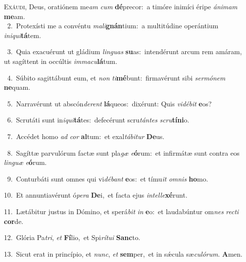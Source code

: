 \lettrine{\initial\textcolor{\initialcolor}{E}}{xáudi,} Deus, oratiónem me\textit{am} \textit{cum} \textbf{dé}\-precor:~\star a timóre inimíci éripe \textit{á}\-\textit{ni}\textit{mam} \textbf{me}\-am.\\
{\numbfont\textcolor{\numbcolor}{~2.}}~Protexísti me a convéntu \textit{ma}\-\textit{li}\textbf{gnán}tium:~\star a multitúdine operántium \textit{in}\-\textit{i}\textit{qui}\textbf{tá}tem.\par
{\numbfont\textcolor{\numbcolor}{~3.}}~Quia exacuérunt ut gládium \textit{lin}\-\textit{guas} \textbf{su}\-as:~\star intendérunt arcum rem amáram, ut sagíttent in occúltis \textit{im}\-\textit{ma}\textit{cu}\textbf{lá}tum.\par
{\numbfont\textcolor{\numbcolor}{~4.}}~Súbito sagittábunt eum, et \textit{non} \textit{ti}\-\textbf{mé}bunt:~\star firmavérunt sibi \textit{ser}\-\textit{mó}\textit{nem} \textbf{ne}\-quam.\par
{\numbfont\textcolor{\numbcolor}{~5.}}~Narravérunt ut abscón\-\textit{de}\-\textit{rent} \textbf{lá}\-queos:~\star dixérunt: Quis \textit{vi}\-\textit{dé}\textit{bit} \textbf{e}\-os?\par
{\numbfont\textcolor{\numbcolor}{~6.}}~Scrutáti sunt in\-\textit{i}\-\textit{qui}\textbf{tá}tes:~\star defecérunt scru\-\textit{tán}\-\textit{tes} \textit{scru}\-\textbf{tí}\textbf{ni}o.\par
{\numbfont\textcolor{\numbcolor}{~7.}}~Accédet homo \textit{ad} \textit{cor} \textbf{al}\-tum:~\star et exal\-\textit{tá}\-\textit{bi}\textit{tur} \textbf{De}\-us.\par
{\numbfont\textcolor{\numbcolor}{~8.}}~Sagíttæ parvulórum factæ sunt pla\textit{gæ} \textit{e}\-\textbf{ó}rum:~\star et infirmátæ sunt contra eos \textit{lin}\-\textit{guæ} \textit{e}\-\textbf{ó}rum.\par
{\numbfont\textcolor{\numbcolor}{~9.}}~Conturbáti sunt omnes qui vi\-\textit{dé}\-\textit{bant} \textbf{e}\-os:~\star et tímu\textit{it} \textit{om}\-\textit{nis} \textbf{ho}\-mo.\par
{\numbfont\textcolor{\numbcolor}{10.}}~Et annuntiavérunt ó\-\textit{pe}\-\textit{ra} \textbf{De}\-i,~\star et facta ejus \textit{in}\-\textit{tel}\textit{le}\textbf{xé}runt.\par
{\numbfont\textcolor{\numbcolor}{11.}}~Lætábitur justus in Dómino, et sperá\textit{bit} \textit{in} \textbf{e}\-o:~\star et laudabúntur om\textit{nes} \textit{rec}\-\textit{ti} \textbf{cor}\-de.\par
{\numbfont\textcolor{\numbcolor}{12.}}~Glória Pa\-\textit{tri}\-, \textit{et} \textbf{Fí}\-lio,~\star et Spi\-\textit{rí}\-\textit{tu}\textit{i} \textbf{Sanc}\-to.\par
{\numbfont\textcolor{\numbcolor}{13.}}~Sicut erat in princípio, et \textit{nunc}\-, \textit{et} \textbf{sem}\-per,~\star et in sǽcula sæ\-\textit{cu}\-\textit{ló}\textit{rum}. \textbf{A}\-men.\par
